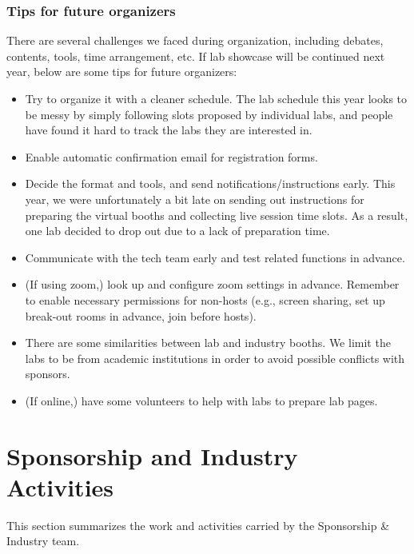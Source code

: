 \documentclass[%
10pt,								%
titlepage,						%
]
{scrartcl}
\def\showTodos{true}
\begin{document}
        \subsubsection{Tips for future organizers}
            There are several challenges we faced during organization, including debates, contents, tools, time arrangement, etc. If lab showcase will be continued next year, below are some tips for future organizers:
            \begin{itemize}
                \item Try to organize it with a cleaner schedule. The lab schedule this year looks to be messy by simply following slots proposed by individual labs, and people have found it hard to track the labs they are interested in.
                \item Enable automatic confirmation email for registration forms.
                \item Decide the format and tools, and send notifications/instructions early. This year, we were unfortunately a bit late on sending out instructions for preparing the virtual booths and collecting live session time slots. As a result, one lab decided to drop out due to a lack of preparation time.
                \item Communicate with the tech team early and test related functions in advance.
                \item (If using zoom,) look up and configure zoom settings in advance. Remember to enable necessary permissions for non-hosts (e.g., screen sharing, set up break-out rooms in advance, join before hosts).
                \item There are some similarities between lab and industry booths. We limit the labs to be from academic institutions in order to avoid possible conflicts with sponsors.
                \item (If online,) have some volunteers to help with labs to prepare lab pages.
            \end{itemize}
    
    
\ifthenelse{\equal{\showTodos}{true}}{
\textcolor{red}{
    \subsection{Music}
        TODO: add content
}}{}   
        
\section{Sponsorship and Industry Activities}
    This section summarizes the work and activities carried by the Sponsorship \& Industry team.
    
\end{document}
